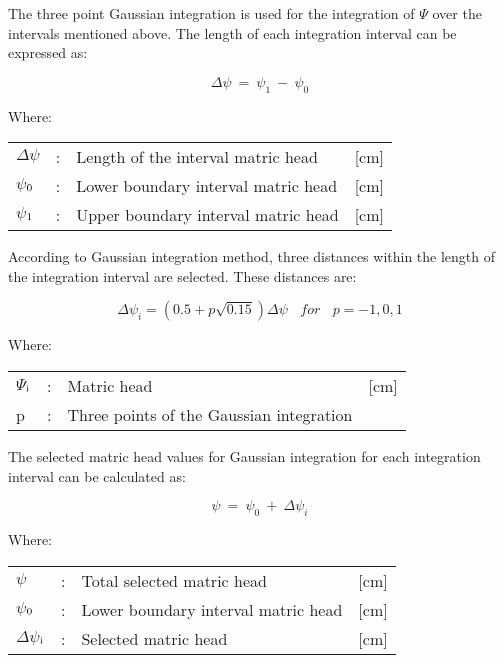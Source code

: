 The three point Gaussian integration is used for the integration of $\Psi$ over the intervals
mentioned above. The length of each integration interval can be expressed as:

\begin{equation}
\label{eq:6.62}
\Delta \psi ~=~ \psi _{1} ~-~ \psi _{0} 
\end{equation}

Where:\\[5pt]
\begin{tabularx}{\textwidth}{llXr}
$\Delta$$\psi$ &:& Length of the interval matric head  & [cm]\\
$\psi$$_{{\rm 0}}$ &:& Lower boundary interval matric head  & [cm]\\
$\psi$$_{{\rm 1}}$ &:& Upper boundary interval matric head  & [cm]\\
\end{tabularx}

According to Gaussian integration method, three distances within the length of the
integration interval are selected. These distances are:

\begin{equation}
\label{eq:6.63}
\Delta \psi_{i} = (0.5 + p \sqrt{0.15}) \Delta \psi ~~~~ for ~~~~ p = -1, 0, 1 
\end{equation}

Where:\\[5pt]
\begin{tabularx}{\textwidth}{llXr}
$\Psi$$_{{\rm i}}$ &:& Matric head  & [cm]\\
p &:& Three points of the Gaussian integration\\
\end{tabularx}

The selected matric head values for Gaussian integration for each integration interval can
be calculated as:

\begin{equation}
\label{eq:6.64}
\psi ~=~ \psi _{0} ~+~\Delta \psi _{i} 
\end{equation}

Where:\\[5pt]
\begin{tabularx}{\textwidth}{llXr}
$\psi$ &:& Total selected matric head  & [cm]\\
$\psi$$_{{\rm 0}}$ &:& Lower boundary interval matric head  & [cm]\\
$\Delta$$\psi$$_{{\rm i}}$ &:& Selected matric head  & [cm]\\
\end{tabularx}

